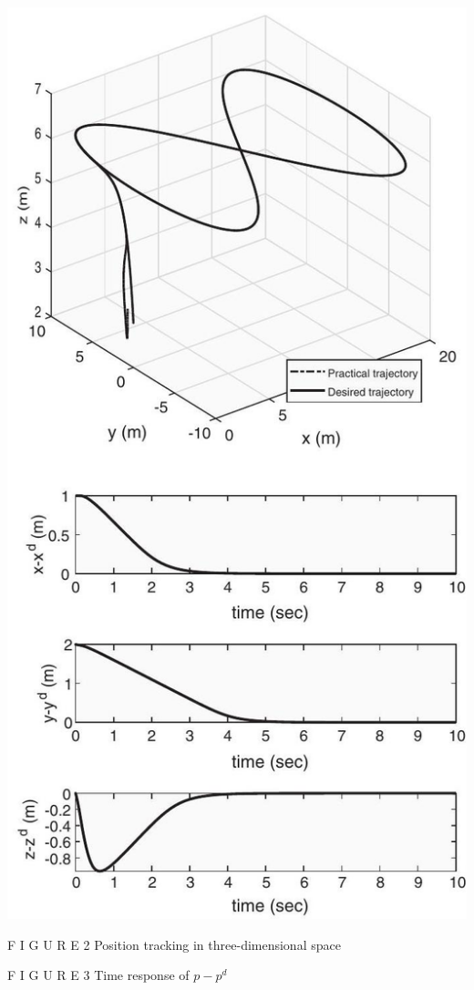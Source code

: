 \documentclass[10pt]{article}
\begin{document}
\includegraphics[max width=\textwidth, center]{2023_10_07_eefdf58cc80a47c1244eg-10}

F I G U R E 2 Position tracking in three-dimensional space

F I G U R E 3 Time response of $p-p^{d}$
\end{document}
